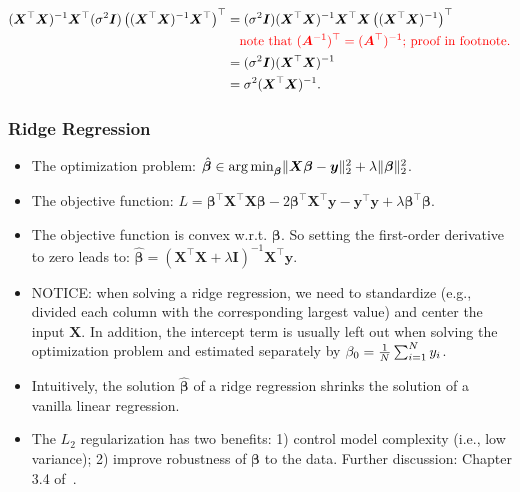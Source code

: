             \begin{equation}
                \begin{aligned}
                     (\bm{X}^\top \bm{X})^{-1} \bm{X}^\top (\sigma^2 \bm{I}) \left( (\bm{X}^\top \bm{X})^{-1} \bm{X}^\top \right)^\top & = (\sigma^2 \bm{I}) (\bm{X}^\top \bm{X})^{-1} \bm{X}^\top  \bm{X}  \left((\bm{X}^\top \bm{X})^{-1}\right)^\top \\
                     & \quad \textcolor{red}{\text{note that $(\bm{A}^{-1})^\top = (\bm{A}^\top)^{-1}$; proof in footnote.}}\\
                     & = (\sigma^2 \bm{I}) (\bm{X}^\top \bm{X})^{-1} \\
                     & = \sigma^2 (\bm{X}^\top \bm{X})^{-1}.
                \end{aligned}
            \end{equation}

         
            
    \subsubsection{Ridge Regression}
        \begin{itemize}
            \item The optimization problem: $\hat{\bm{\beta}} \in \operatorname{arg\,min}_{\bm{\beta}} \lVert\bm{X} \bm{\beta} - \bm{y}\rVert_2^2 + \lambda\lVert\bm{\beta}\rVert_2^2$.
            \item The objective function: $L = \bm{\beta}^\top \bm{X}^\top \bm{X} \bm{\beta} - 2 \bm{\beta}^\top \bm{X}^\top \bm{y} - \bm{y}^\top \bm{y} + \lambda \bm{\beta}^\top \bm{\beta}$.
            \item The objective function is convex w.r.t. $\bm{\beta}$. So setting the first-order derivative to zero leads to: $\hat{\bm{\beta}} = (\bm{X}^\top \bm{X} + \lambda \bm{I})^{-1} \bm{X}^\top \bm{y}$.
            \item NOTICE: when solving a ridge regression, we need to standardize (e.g., divided each column with the corresponding largest value)  and center the input $\bm{X}$. In addition, the intercept term is usually left out when solving the optimization problem and estimated separately by $\beta_0 = \frac{1}{N}\sum_{i=1}^{N}{y_i}$.
            \item Intuitively, the solution $\hat{\bm{\beta}}$ of a ridge regression shrinks the solution of a vanilla linear regression.
            \item The $L_2$ regularization has two benefits: 1) control model complexity (i.e., low variance); 2) improve robustness of $\bm{\beta}$ to the data. Further discussion: Chapter 3.4 of~\cite{hastie2009elements}.
        \end{itemize}
        
